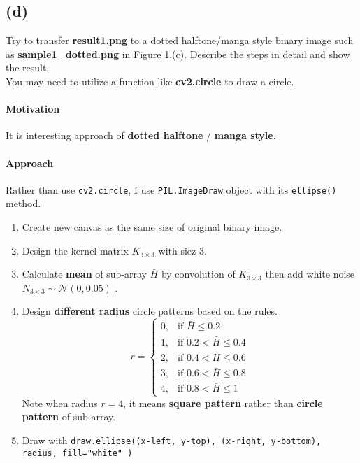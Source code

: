 
\subsection{(d)}\label{1_d}
Try to transfer \textbf{result1.png} to a dotted halftone/manga style binary image such as \textbf{sample1\_dotted.png} in Figure 1.(c). Describe the steps in detail and show the result. \\
You may need to utilize a function like \textbf{cv2.circle} to draw a circle.

\paragraph{Motivation}
It is interesting approach of \textbf{dotted halftone} / \textbf{manga style}.

\paragraph{Approach}
Rather than use \texttt{cv2.circle}, I use \texttt{PIL.ImageDraw} object with its \texttt{ellipse()} method.
\begin{enumerate}
    \item Create new canvas as the same size of original binary image.
    \item Design the kernel matrix \(K_{3 \times 3}\) with siez \(3\).
    \item Calculate \textbf{mean} of sub-array \(\bar{H}\)  by convolution of \(K_{3 \times 3}\) then add white noise \(N_{3 \times 3} \sim \mathcal{N}(0, 0.05)\) .
    \item Design \textbf{different radius} circle patterns based on the rules.
	\[
	    r = 
	    \begin{cases}
		0 ,& \text{if } \bar{H} \leq 0.2\\
		1 ,& \text{if } 0.2 < \bar{H} \leq 0.4\\
		2 ,& \text{if } 0.4 < \bar{H} \leq 0.6\\
		3 ,& \text{if } 0.6 < \bar{H} \leq 0.8\\
	        4 ,& \text{if } 0.8 < \bar{H} \leq 1
	    \end{cases}
	\]
	Note when radius \(r=4\), it means \textbf{square pattern} rather than \textbf{circle pattern} of sub-array.
    \item Draw with \texttt{draw.ellipse((x-left, y-top), (x-right, y-bottom), radius, fill="white" )}  
\end{enumerate}

